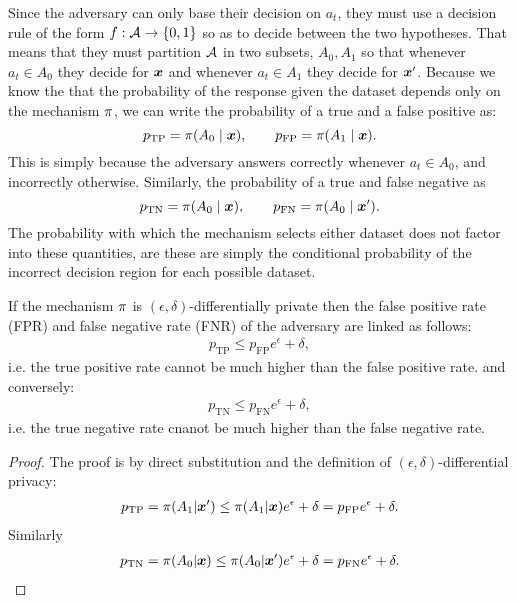 Since the adversary can only base their decision on $a_t$, they must
use a decision rule of the form $f : {\mathcal{A}} \to \{0,1\}$ so as to decide
between the two hypotheses.  That means that they must partition ${\mathcal{A}}$
in two subsets, $A_0, A_1$ so that whenever $a_t \in A_0$ they
decide for $\bx$ and whenever $a_t \in A_1$ they decide for
$\bx'$. Because we know the that the probability of the 
response given the dataset depends only on the mechanism $\pi$, we
can write the probability of a true and a false positive as:
\[
  p_{\textrm{TP}} = \pol(A_0 \mid \bx), \qquad p_{\textrm{FP}} = \pol(A_1 \mid \bx).
\]
This is simply because the adversary answers correctly whenever
$a_t \in A_0$, and incorrectly otherwise. Similarly, the probability
of a true and false negative as
\[
  p_{\textrm{TN}} = \pol(A_0 \mid \bx), \qquad p_{\textrm{FN}} = \pol(A_0 \mid \bx').
\]
The probability with which the mechanism selects either dataset does
not factor into these quantities, are these are simply the conditional
probability of the incorrect decision region for each possible
dataset.

\begin{theorem}
  If the mechanism $\pi$ is $(\epsilon, \delta)$-differentially private then
  the false positive rate (FPR) and false negative rate (FNR) of the
  adversary are linked as follows:
  \begin{align*}
    p_{\textrm{TP}}\leq p_{\textrm{FP}} e^\epsilon  + \delta,
  \end{align*}
  i.e. the true positive rate cannot be much higher than the false positive rate. and conversely:
  \begin{align*}
    p_{\textrm{TN}}\leq p_{\textrm{FN}} e^\epsilon  + \delta,
  \end{align*}
  i.e. the true negative rate cnanot be much higher than the false
  negative rate.
\end{theorem}
\begin{proof}
  The proof is by direct substitution and the definition of $(\epsilon, \delta)$-differential privacy:
  \begin{align*}
    p_{\textrm{TP}} = \pol(A_1 | \bx') \leq \pol(A_1 | \bx) e^\epsilon  + \delta = p_{\textrm{FP}} e^\epsilon  + \delta.
  \end{align*}
  Similarly
  \begin{align*}
    p_{\textrm{TN}} = \pol(A_0 | \bx) \leq \pol(A_0 | \bx') e^\epsilon  + \delta
    = p_{\textrm{FN}} e^\epsilon  + \delta.
  \end{align*}
\end{proof}


